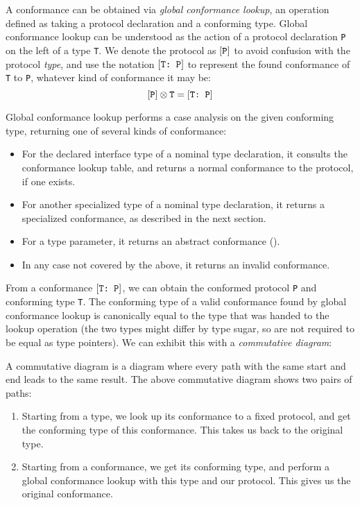 \documentclass[../generics]{subfiles}
\begin{document}
A conformance can be obtained via \emph{global conformance lookup}, an operation defined as taking a protocol declaration and a conforming type. Global conformance lookup can be understood as the action of a protocol declaration \texttt{P} on the left of a type \texttt{T}. We denote the protocol as $[\texttt{P}]$ to avoid confusion with the protocol \emph{type}, and use the notation $[\texttt{T:~P}]$ to represent the found conformance of \texttt{T} to \texttt{P}, whatever kind of conformance it may be:\index{$\otimes$}
\[[\texttt{P}]\otimes\texttt{T} = [\texttt{T:~P}]\]

Global conformance lookup performs a case analysis on the given conforming type, returning one of several kinds of conformance:
\begin{itemize}
\item For the declared interface type of a nominal type declaration, it consults the conformance lookup table, and returns a normal conformance to the protocol, if one exists.
\item For another specialized type of a nominal type declaration, it returns a specialized conformance, as described in the next section.
\item For a type parameter, it returns an abstract conformance ().
\item In any case not covered by the above, it returns an invalid conformance.
\end{itemize}

From a conformance $[\texttt{T:~P}]$, we can obtain the conformed protocol \texttt{P} and conforming type \texttt{T}. The conforming type of a valid conformance found by global conformance lookup is canonically equal to the type that was handed to the lookup operation (the two types might differ by type sugar, so are not required to be equal as type pointers). We can exhibit this with a \emph{commutative diagram}:
\begin{quote}
\end{quote}
A commutative diagram is a diagram where every path with the same start and end leads to the same result. The above commutative diagram shows two pairs of paths:
\begin{enumerate}
\item Starting from a type, we look up its conformance to a fixed protocol, and get the conforming type of this conformance. This takes us back to the original type.
\item Starting from a conformance, we get its conforming type, and perform a global conformance lookup with this type and our protocol. This gives us the original conformance.
\end{enumerate}
\end{document}
